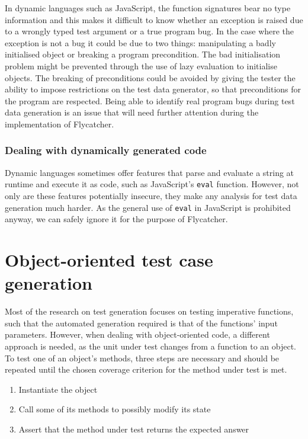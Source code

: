 \documentclass[a4paper,11pt,titlepage]{report}
\begin{document}
In dynamic languages such as JavaScript, the function signatures bear no type information and this makes it difficult to know whether an exception is raised due to a wrongly typed test argument or a true program bug. In the case where the exception is not a bug it could be due to two things: manipulating a badly initialised object or breaking a program precondition. The bad initialisation problem might be prevented through the use of lazy evaluation to initialise objects. The breaking of preconditions could be avoided by giving the tester the ability to impose restrictions on the test data generator, so that preconditions for the program are respected. Being able to identify real program bugs during test data generation is an issue that will need further attention during the implementation of Flycatcher.

\subsubsection{Dealing with dynamically generated code}

Dynamic languages sometimes offer features that parse and evaluate a string at runtime and execute it as code, such as JavaScript's \texttt{eval} function. However, not only are these features potentially insecure, they make any analysis for test data generation much harder. As the general use of \texttt{eval} in JavaScript is prohibited anyway, we can safely ignore it for the purpose of Flycatcher.

\section{Object-oriented test case generation}
Most of the research on test generation focuses on testing imperative functions, such that the automated generation required is that of the functions' input parameters. However, when dealing with object-oriented code, a different approach is needed, as the unit under test changes from a function to an object. To test one of an object's methods, three steps are necessary \cite{tonella2004evolutionary} and should be repeated until the chosen coverage criterion for the method under test is met.
\begin{enumerate}
	\item Instantiate the object
	\item Call some of its methods to possibly modify its state
	\item Assert that the method under test returns the expected answer
\end{enumerate}
\end{document}
